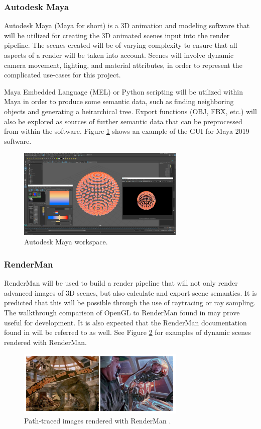 \documentclass[conference]{IEEEtran}
\begin{document}
\subsubsection{Autodesk Maya}
Autodesk Maya (Maya for short) is a 3D animation and modeling software that will be utilized
for creating the 3D animated scenes input into the render pipeline.
The scenes created will be of varying complexity to ensure that all aspects of a
render will be taken into account.
Scenes will involve dynamic camera movement, lighting, and material attributes, in order
to represent the complicated use-cases for this project.

Maya Embedded Language (MEL) or Python scripting
will be utilized within Maya in order to produce some semantic data, such as finding neighboring
objects and generating a heirarchical tree. Export functions (OBJ, FBX, etc.) will also be explored
as sources of further semantic data that can be preprocessed from within the software.
Figure \ref{fig:maya} shows an example of the GUI for Maya 2019 software.

\begin{figure}[htbp]
\centerline{\includegraphics[width=8cm]{maya.png}}
\caption{Autodesk Maya workspace.}
\label{fig:maya}
\end{figure}

\subsubsection{RenderMan}
RenderMan will be used to build a render pipeline that will not only render advanced images
of 3D scenes, but also calculate and export scene semantics.
It is predicted that this will be possible through the use of raytracing or ray sampling.
The walkthrough comparison of OpenGL to RenderMan found in \cite{renderman_opengl}
may prove useful for development.
It is also expected that the RenderMan documentation found in \cite{renderman_docs}
will be referred to as well.
See Figure \ref{fig:renderman} for examples of dynamic scenes rendered with RenderMan.

\begin{figure}[htbp]
\centerline{\includegraphics[width=8cm]{renderman.png}}
\caption{Path-traced images rendered with RenderMan \cite{renderman}.}
\label{fig:renderman}
\end{figure}
\end{document}
